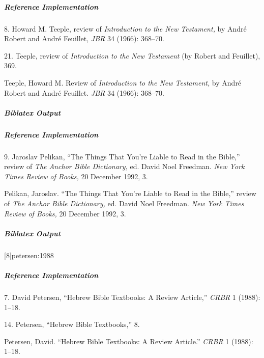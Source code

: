 \documentclass[a4paper]{article}
\newenvironment{biboutput}{%
  \subparagraph{Biblatex Output}
}{\color{black}}
\newenvironment{refimp}{%
  \subparagraph{Reference Implementation}
  \color{reference-colour}
  \rm
}{\par\color{black}}
\begin{document}
\begin{refimp}
  \hspace*{\bibindent}8. Howard M. Teeple, review of \emph{Introduction to the
  New Testament,} by André Robert and André Feuillet, \emph{JBR} 34 (1966):
  368–70.
  
  \hspace*{\bibindent}21. Teeple, review of \emph{Introduction to the New
  Testament} (by Robert and Feuillet), 369.

  \hangindent\bibindent Teeple, Howard M. Review of \emph{Introduction to the
  New Testament,} by André Robert and André Feuillet. \emph{JBR} 34 (1966):
  368–70.

\end{refimp}

\begin{biboutput}
\end{biboutput}

\begin{refimp}
  \hspace*{\bibindent}9. Jaroslav Pelikan, “The Things That You're Liable to
  Read in the Bible,” review of \emph{The Anchor Bible Dictionary,} ed.\@
  David Noel Freedman. \emph{New York Times Review of Books,} 20 December
  1992, 3.
  
  \hangindent\bibindent Pelikan, Jaroslav. “The Things That You're Liable to
  Read in the Bible,” review of \emph{The Anchor Bible Dictionary,} ed.\@
  David Noel Freedman. \emph{New York Times Review of Books,} 20 December
  1992, 3.
\end{refimp}

\begin{biboutput}
  [8]{petersen:1988}
\end{biboutput}

\begin{refimp}
  \hspace*{\bibindent}7. David Petersen, “Hebrew Bible Textbooks: A Review
  Article,” \emph{CRBR} 1 (1988): 1–18.

  \hspace*{\bibindent}14. Petersen, “Hebrew Bible Textbooks,” 8.

  \hangindent\bibindent Petersen, David. “Hebrew Bible Textbooks: A Review
  Article.” \emph{CRBR} 1 (1988): 1–18.

\end{refimp}
\end{document}
